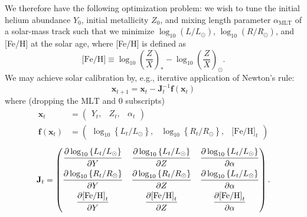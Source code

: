 We therefore have the following optimization problem: 
we wish to tune the initial helium abundance $Y_0$, initial metallicity $Z_0$, and mixing length parameter $\alpha_{\text{MLT}}$ of a solar-mass track such that we minimize ${\log_{10}\left(L/L_\odot\right)}$,  ${\log_{10}\left(R/R_\odot\right)}$, and [Fe/H] at the solar age, where [Fe/H] is defined as
\begin{equation}
    \text{[Fe/H]}
    \equiv
    \log_{10}\left( \frac{Z}{X} \right)_\ast
    -
    \log_{10}\left( \frac{Z}{X} \right)_\odot.
\end{equation}
We may achieve solar calibration by, e.g., iterative application of Newton's rule: 
\begin{equation}
    \mathbf{x}_{t+1}
    =
    \mathbf{x}_t - \mathbf{J}_t^{-1} \mathbf{f}(\mathbf{x}_t)
\end{equation}
where (dropping the $\text{MLT}$ and $0$ subscripts)
\begin{align}
    \mathbf{x}_t
    &=
    \begin{pmatrix} Y_t , & Z_t , & \alpha_t \end{pmatrix}
    \\
    \mathbf{f}(\mathbf{x}_t)
    &=
    \begin{pmatrix} 
        \log_{10} \left\{ L_t/L_\odot \right\}, &
        \log_{10} \left\{ R_t/R_\odot \right\}, &
        \text{[Fe/H]}_t
    \end{pmatrix}
\end{align}
\begin{equation}
    \mathbf{J}_t
    =
    \begin{pmatrix} 
        \dfrac{\strut\partial \log_{10} \left\{ L_t/L_\odot \right\}}{\strut\partial Y} &
        \dfrac{\strut\partial \log_{10} \left\{ L_t/L_\odot \right\}}{\strut\partial Z} &
        \dfrac{\strut\partial \log_{10} \left\{ L_t/L_\odot \right\}}{\strut\partial \alpha}\\
        \dfrac{\strut\partial \log_{10} \left\{ R_t/R_\odot \right\}}{\strut\partial Y} &
        \dfrac{\strut\partial \log_{10} \left\{ R_t/R_\odot \right\}}{\strut\partial Z} &
        \dfrac{\strut\partial \log_{10} \left\{ L_t/L_\odot \right\}}{\strut\partial \alpha}\\
        \dfrac{\strut\partial \text{[Fe/H]}_t}{\strut\partial Y} &
        \dfrac{\strut\partial \text{[Fe/H]}_t}{\strut\partial Z} &
        \dfrac{\strut\partial \text{[Fe/H]}_t}{\strut\partial \alpha}
    \end{pmatrix}.
\end{equation}
